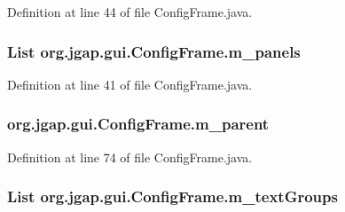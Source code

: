Definition at line 44 of file Config\-Frame.\-java.

\hypertarget{classorg_1_1jgap_1_1gui_1_1_config_frame_ac4dbcce3d6c9d588ee5e845f83889c57}{
\subsubsection[{m\-\_\-panels}]{\setlength{\rightskip}{0pt plus 5cm}List org.\-jgap.\-gui.\-Config\-Frame.\-m\-\_\-panels\hspace{0.3cm}{\ttfamily [private]}}}\label{classorg_1_1jgap_1_1gui_1_1_config_frame_ac4dbcce3d6c9d588ee5e845f83889c57}


Definition at line 41 of file Config\-Frame.\-java.

\hypertarget{classorg_1_1jgap_1_1gui_1_1_config_frame_a59f7c912b976ba4876ce3177bcde11ce}{
\subsubsection[{m\-\_\-parent}]{ org.\-jgap.\-gui.\-Config\-Frame.\-m\-\_\-parent\hspace{0.3cm}{\ttfamily [private]}}}\label{classorg_1_1jgap_1_1gui_1_1_config_frame_a59f7c912b976ba4876ce3177bcde11ce}


Definition at line 74 of file Config\-Frame.\-java.

\hypertarget{classorg_1_1jgap_1_1gui_1_1_config_frame_adaeb8f407033d19e60df07253555e532}{
\subsubsection[{m\-\_\-text\-Groups}]{\setlength{\rightskip}{0pt plus 5cm}List org.\-jgap.\-gui.\-Config\-Frame.\-m\-\_\-text\-Groups\hspace{0.3cm}{\ttfamily [private]}}}\label{classorg_1_1jgap_1_1gui_1_1_config_frame_adaeb8f407033d19e60df07253555e532}


